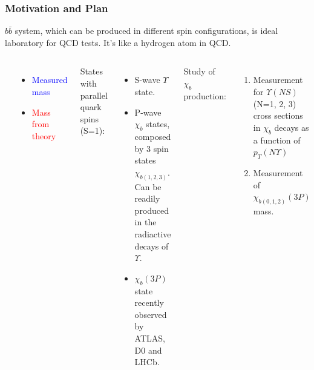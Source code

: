 \documentclass{beamer}
\begin{document}
\begin{frame}
\frametitle{Motivation and Plan}
$b\bar{b}$ system, which can be produced in different spin configurations, is ideal laboratory for QCD tests. It's like a hydrogen atom in QCD.
\begin{columns}[c]
\includegraphics[width=\textwidth]{images/bfamily.png}
\begin{itemize}
  \item \textcolor{blue}{Measured mass}
  \item \textcolor{red}{Mass from theory}
\end{itemize}
States with parallel quark spins (S=1):
\begin{itemize}
  \item S-wave $\Upsilon$ state.
  \item P-wave $\chi_{b}$ states, composed by 3 spin states $\chi_{b(1,2,3)}$. Can be readily produced in the radiactive decays of $\Upsilon$.
  \item $\chi_{b}(3P)$ state recently observed by ATLAS, D0 and LHCb.
\end{itemize}
Study of $\chi_{b}$ production:
\begin{enumerate}
  \item Measurement for $\Upsilon(NS)$ (N=1, 2, 3) cross sections in $\chi_b$ decays as a function of $p_T(N\Upsilon)$
  \item Measurement of $\chi_{b(0,1,2)}(3P)$ mass.
\end{enumerate}
\end{columns}
\end{frame}
\end{document}
